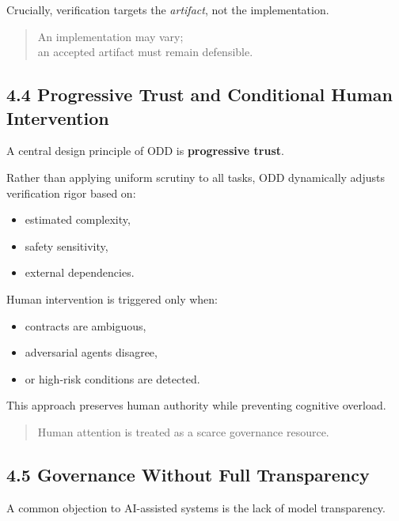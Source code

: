 \documentclass[
]{article}
\begin{document}
Crucially, verification targets the \emph{artifact}, not the
implementation.

\begin{quote}
An implementation may vary;\\
an accepted artifact must remain defensible.
\end{quote}

\hypertarget{44-progressive-trust-and-conditional-human-intervention}{%
\subsection{4.4 Progressive Trust and Conditional Human
Intervention}\label{44-progressive-trust-and-conditional-human-intervention}}

A central design principle of ODD is \textbf{progressive trust}.

Rather than applying uniform scrutiny to all tasks, ODD dynamically
adjusts verification rigor based on:

\begin{itemize}
\item
  estimated complexity,
\item
  safety sensitivity,
\item
  external dependencies.
\end{itemize}

Human intervention is triggered only when:

\begin{itemize}
\item
  contracts are ambiguous,
\item
  adversarial agents disagree,
\item
  or high-risk conditions are detected.
\end{itemize}

This approach preserves human authority while preventing cognitive
overload.

\begin{quote}
Human attention is treated as a scarce governance resource.
\end{quote}

\hypertarget{45-governance-without-full-transparency}{%
\subsection{4.5 Governance Without Full
Transparency}\label{45-governance-without-full-transparency}}

A common objection to AI-assisted systems is the lack of model
transparency.
\end{document}
